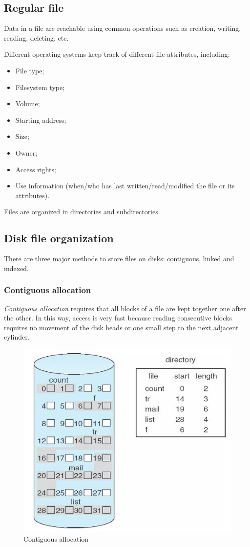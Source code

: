 \subsection{Regular file}
Data in a file are reachable using common operations such as creation, writing, reading, deleting, etc.

Different operating systems keep track of different file attributes, including:
\begin{itemize}
\item File type;
\item Filesystem type;
\item Volume;
\item Starting address;
\item Size;
\item Owner;
\item Access rights;
\item Use information (when/who has last written/read/modified the file or its attributes).
\end{itemize}
Files are organized in directories and subdirectories.

\subsection{Disk file organization}
There are three major methods to store files on disks: contiguous, linked and indexed.

\subsubsection{Contiguous allocation}
\emph{Contiguous allocation} requires that all blocks of a file are kept together one after the other. In this way, access is very fast because reading consecutive blocks requires no movement of the disk heads or one small step to the next adjacent cylinder.

\begin{figure}[hbtp]
\centering
\includegraphics[scale=0.35]{images/file_system/contiguous_allocation.png}
\caption{Contiguous allocation}
\end{figure}

